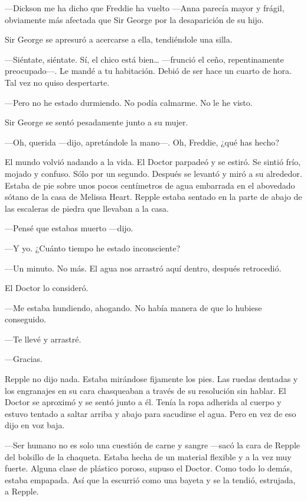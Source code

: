 \mbox{}

{---Dickson me ha dicho que Freddie ha vuelto ---Anna parecía mayor y
	frágil, obviamente más afectada que Sir George por la desaparición de su
hijo.}

{Sir George se apresuró a acercarse a ella, tendiéndole una silla.}

{---Siéntate, siéntate. Sí, el chico está bien\ldots{} ---frunció el
	ceño, repentinamente preocupado---. Le mandé a tu habitación. Debió de
ser hace un cuarto de hora. Tal vez no quiso despertarte.}

{---Pero no he estado durmiendo. No podía calmarme. No le he visto.}

{Sir George se sentó pesadamente junto a su mujer.}

{---Oh, querida ---dijo, apretándole la mano---. Oh, Freddie, ¿qué has
hecho?}

\mbox{}

{El mundo volvió nadando a la vida. El Doctor parpadeó y se estiró. Se
	sintió frío, mojado y confuso. Sólo por un segundo. Después se levantó y
	miró a su alrededor. Estaba de pie sobre unos pocos centímetros de agua
	embarrada en el abovedado sótano de la casa de Melissa Heart. Repple
	estaba sentado en la parte de abajo de las escaleras de piedra que
llevaban a la casa.}

{---Pensé que estabas muerto ---dijo.}

{---Y yo. ¿Cuánto tiempo he estado inconsciente?}

{---Un minuto. No más. El agua nos arrastró aquí dentro, después
retrocedió.}

{El Doctor lo consideró.}

{---Me estaba hundiendo, ahogando. No había manera de que lo hubiese
conseguido.}

{---Te llevé y arrastré.}

{---Gracias.}

{Repple no dijo nada. Estaba mirándose fijamente los pies. Las ruedas
	dentadas y los engranajes en su cara chasqueaban a través de su
	resolución sin hablar. El Doctor se aproximó y se sentó junto a él.
	Tenía la ropa adherida al cuerpo y estuvo tentado a saltar arriba y
abajo para sacudirse el agua. Pero en vez de eso dijo en voz baja.}

{---Ser humano no es solo una cuestión de carne y sangre ---sacó la cara
	de Repple del bolsillo de la chaqueta. Estaba hecha de un material
	flexible y a la vez muy fuerte. Alguna clase de plástico poroso, supuso
	el Doctor. Como todo lo demás, estaba empapada. Así que la escurrió como
una bayeta y se la tendió, estrujada, a Repple.}

